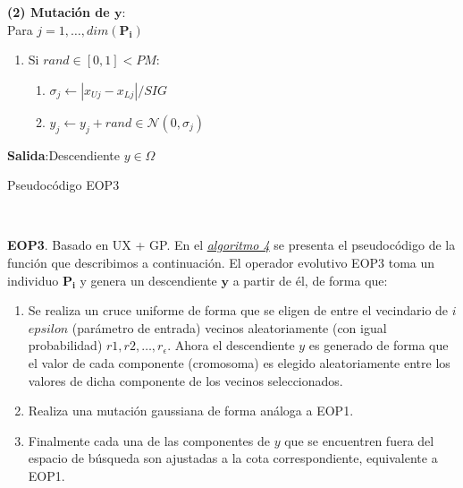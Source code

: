 \begin{minipage}{\textwidth}
\begin{algorithm}[H]
\begin{multicols}{2}
        \vspace{0.3cm} \textbf{(2) Mutación de $\boldsymbol{y}$}:\\
        Para $j = 1, \dots, dim(\boldsymbol{P_i})$\\
                \begin{enumerate}
                    \item Si $rand \in [0,1] < PM $: 
                    \begin{enumerate}
                        \item $\sigma_j \gets |x_{Uj} - x_{Lj}|/SIG$
                        \item $y_j \gets y_j + rand \in \mathcal{N}(0, \sigma_j)$ 
                    \end{enumerate}
                \end{enumerate}
        \end{multicols}
        
             \vspace{0.1cm}\textbf{Salida}:Descendiente $y \in \Omega$
         \caption{Pseudocódigo EOP3}
         \label{alg:4}
        \end{algorithm}
        \end{minipage}\\ \vspace{0.2cm}

\noindent\textbf{EOP3}. Basado en UX + GP. En el \hyperref[alg:4]{\textit{algoritmo 4}} se presenta el pseudocódigo de la función que describimos a continuación. El operador evolutivo EOP3 toma un individuo $\boldsymbol{P_i}$ y genera un descendiente $\boldsymbol{y}$ a partir de él, de forma que:\\
    
    \begin{enumerate}
        \item Se realiza un cruce uniforme de forma que se eligen de entre el vecindario de $i$ $epsilon$ (parámetro de entrada) vecinos aleatoriamente (con igual probabilidad) $r1, r2, \dots, r_\epsilon$. Ahora el descendiente $y$ es generado de forma que el valor de cada componente (cromosoma) es elegido aleatoriamente entre los valores de dicha componente de los vecinos seleccionados.\\
        
        \item Realiza una mutación gaussiana de forma análoga a EOP1.\\
        
        \item Finalmente cada una de las componentes de $y$ que se encuentren fuera del espacio de búsqueda son ajustadas a la cota correspondiente, equivalente a EOP1.\\
        
    \end{enumerate}

